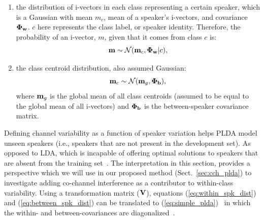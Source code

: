 \begin{enumerate}
	\item the distribution of i-vectors in each class representing a certain speaker, which is a Gaussian with mean $m_c$, mean of a speaker's i-vectors, and covariance ${\bf \Phi_w}$. $c$ here represents the class label, or speaker identity. Therefore, the probability of an i-vector, $m$, given that it comes from class $c$ is:
	\begin{equation}
	\label{eq:within_spk_dist}
	{\bf m} \sim \mathcal{N} ({\bf m}_c,{\bf \Phi_w} | c),
	\end{equation}
	\item the class centroid distribution, also assumed Gaussian:
	\begin{equation}
	\label{eq:between_spk_dist}
	{\bf m}_c \sim \mathcal{N} ({\bf m}_g,{\bf \Phi_b}),
	\end{equation}
	where ${\bf m}_g$ is the global mean of all class centroids (assumed to be equal to the global mean of all i-vectors) and ${\bf \Phi_b}$ is the between-speaker covariance matrix. 
\end{enumerate}

Defining channel variability as a function of speaker variation helps PLDA model unseen speakers (i.e., speakers that are not present in the development set). 
As opposed to LDA, which is incapable of offering optimal solutions to speakers that are absent from the training set~\cite{ioffePLDA2006}. 
The interpretation in this section, provides a perspective which we will use in our proposed method (Sect.~\ref{sec:cch_plda}) to investigate adding co-channel interference as a contributor to within-class variability. 
Using a transformation matrix (${\bf V}$), equations (\ref{eq:within_spk_dist}) and (\ref{eq:between_spk_dist}) can be translated to (\ref{eq:simple_plda})~\cite{sizov2014unifying} in which the within- and between-covariances are diagonalized~\cite{ioffePLDA2006}. 


